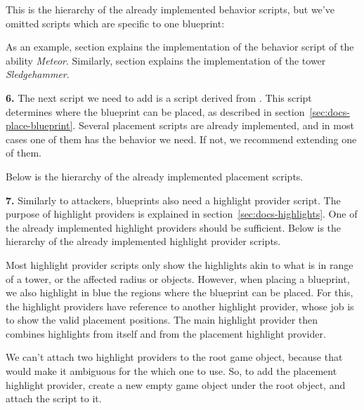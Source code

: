 This is the hierarchy of the already implemented behavior scripts, but we've omitted scripts which are specific to one blueprint:

As an example, section  explains the implementation of the behavior script of the ability \emph{Meteor}.
Similarly, section  explains the implementation of the tower \emph{Sledgehammer}.

\textbf{6.}
The next script we need to add is a script derived from .
This script determines where the blueprint can be placed, as described in section~\ref{sec:docs-place-blueprint}.
Several placement scripts are already implemented, and in most cases one of them has the behavior we need.
If not, we recommend extending one of them.

Below is the hierarchy of the already implemented placement scripts.

\textbf{7.}
Similarly to attackers, blueprints also need a highlight provider script.
The purpose of highlight providers is explained in section~\ref{sec:docs-highlights}.
One of the already implemented highlight providers should be sufficient.
Below is the hierarchy of the already implemented highlight provider scripts.

Most highlight provider scripts only show the highlights akin to what is in range of a tower, or the affected radius or objects.
However, when placing a blueprint, we also highlight in blue the regions where the blueprint can be placed.
For this, the highlight providers have reference to another highlight provider, whose job is to show the valid placement positions.
The main highlight provider then combines highlights from itself and from the placement highlight provider.

We can't attach two highlight providers to the root game object, because that would make it ambiguous for the  which one to use.
So, to add the placement highlight provider, create a new empty game object under the root object, and attach the script to it.

